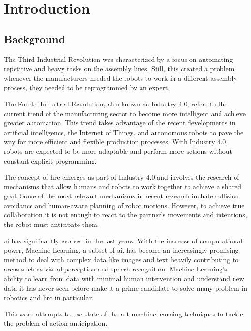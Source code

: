 \chapter{Introduction}
\label{chapter:introduction}


\section{Background}

The Third Industrial Revolution was characterized by a focus on automating repetitive and heavy tasks on the assembly lines. Still, this created a problem: whenever the manufacturers needed the robots to work in a different assembly process, they needed to be reprogrammed by an expert.

The Fourth Industrial Revolution, also known as Industry 4.0, refers to the current trend of the manufacturing sector to become more intelligent and achieve greater automation. This trend takes advantage of the recent developments in artificial intelligence, the Internet of Things, and autonomous robots to pave the way for more efficient and flexible production processes. With Industry 4.0, robots are expected to be more adaptable and perform more actions without constant explicit programming.

The concept of \acf{hrc} emerges as part of Industry 4.0 and involves the research of mechanisms that allow humans and robots to work together to achieve a shared goal. Some of the most relevant mechanisms in recent research include collision avoidance and human-aware planning of robot motions. However, to achieve true collaboration it is not enough to react to the partner's movements and intentions, the robot must anticipate them.

\acf{ai} has significantly evolved in the last years. With the increase of computational power, Machine Learning, a subset of \acs{ai}, has become an increasingly promising method to deal with complex data like images and text heavily contributing to areas such as visual perception and speech recognition. Machine Learning's ability to learn from data with minimal human intervention and understand new data it has never seen before make it a prime candidate to solve many problem in robotics and \acs{hrc} in particular.

This work attempts to use state-of-the-art machine learning techniques to tackle the problem of action anticipation.

